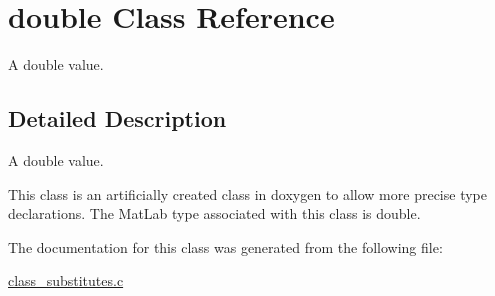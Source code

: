 \hypertarget{a00005}{\section{double Class Reference}
\label{a00005}
}


A double value.  




\subsection{Detailed Description}
A double value. 

This class is an artificially created class in doxygen to allow more precise type declarations. The Mat\-Lab type associated with this class is double. 

The documentation for this class was generated from the following file\-:\begin{DoxyCompactItemize}
\item 
\hyperlink{a00016}{class\-\_\-substitutes.\-c}\end{DoxyCompactItemize}
